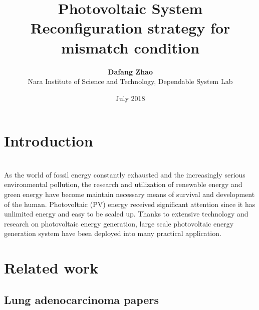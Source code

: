\documentclass[twocolumn]{article}
\title{\textbf{Photovoltaic System Reconfiguration strategy for mismatch condition}}%
\date{July 2018}
\author{\textbf{Dafang Zhao}\\Nara Institute of Science and Technology, Dependable System Lab}
\begin{document}
\maketitle

\section{Introduction}
\\As the world of fossil energy constantly exhausted and the increasingly serious environmental pollution, the research and utilization of renewable energy and green energy have become maintain necessary means of survival and development of the human. Photovoltaic (PV) energy received significant attention since it has unlimited energy and easy to be scaled up. Thanks to extensive technology and research on photovoltaic energy generation, large scale photovoltaic energy generation system have been deployed into many practical application.


\section{Related work}
\subsection{Lung adenocarcinoma papers}
\end{document}
